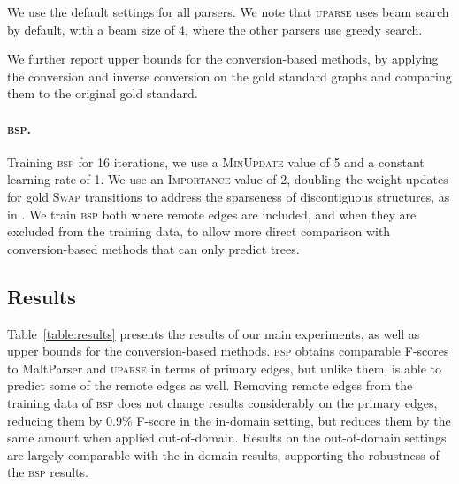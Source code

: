 \documentclass[11pt]{article}
\newcommand{\tabref}[1]{Table~\ref{#1}}
\begin{document}
We use the default settings for all parsers.
We note that \textsc{uparse} uses beam search by default,
with a beam size of 4, where the other parsers use greedy search.




We further report upper bounds for the conversion-based methods, by applying
the conversion and inverse conversion on the gold standard graphs and comparing
them to the original gold standard.

\paragraph{\textsc{bsp}.}
Training \textsc{bsp} for 16 iterations, we use a \textsc{MinUpdate} value of 5 and a constant learning rate of 1.
We use an \textsc{Importance} value of 2, doubling the weight updates
for gold \textsc{Swap} transitions to address the sparseness
of discontiguous structures, as in \cite{maier2015discontinuous}.
We train \textsc{bsp} both where remote edges
are included, and when they are excluded from the training data, to allow
more direct comparison with conversion-based methods that can only
predict trees.

\subsection{Results}

\tabref{table:results} presents the results of our main experiments, as well as
upper bounds for the conversion-based methods.
\textsc{bsp} obtains comparable F-scores to MaltParser and \textsc{uparse}
in terms of primary edges, but unlike them, is able to predict some
of the remote edges as well. 
Removing remote edges from the training data of \textsc{bsp} does not
change results considerably on the primary edges,
reducing them by 0.9\% F-score in the in-domain setting, but reduces
them by the same amount when applied out-of-domain. Results on
the out-of-domain settings are largely comparable with the in-domain
results, supporting the robustness of the \textsc{bsp} results.
\end{document}
